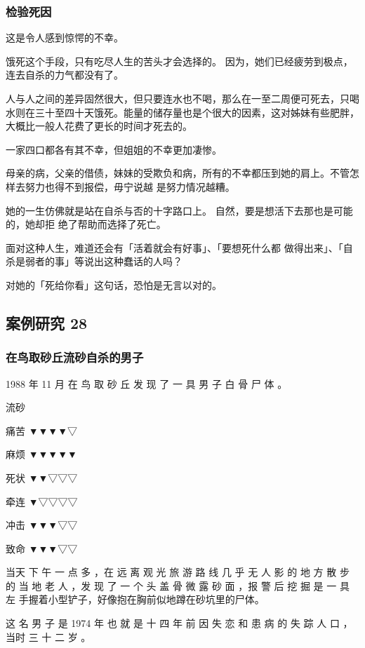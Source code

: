 \documentclass[UTF8]{ctexart}
\begin{document}
\subsubsection*{检验死因}

这是令人感到惊愕的不幸。

饿死这个手段，只有吃尽人生的苦头才会选择的。
因为，她们已经疲劳到极点，连去自杀的力气都没有了。

人与人之间的差异固然很大，但只要连水也不喝，那么在一至二周便可死去，只喝水则在三十至四十天饿死。能量的储存量也是个很大的因素，这对姊妹有些肥胖，大概比一般人花费了更长的时间才死去的。

一家四口都各有其不幸，但姐姐的不幸更加凄惨。

母亲的病，父亲的借债，妹妹的受欺负和病，所有的不幸都压到她的肩上。不管怎样去努力也得不到报偿，毋宁说越 是努力情况越糟。

她的一生仿佛就是站在自杀与否的十字路口上。
自然，要是想活下去那也是可能的，她却拒 绝了帮助而选择了死亡。

面对这种人生，难道还会有「活着就会有好事」、「要想死什么都 做得出来」、「自杀是弱者的事」等说出这种蠢话的人吗？

对她的「死给你看」这句话，恐怕是无言以对的。



\subsection{案例研究 28}

\subsubsection*{在鸟取砂丘流砂自杀的男子}

1988 年 11 月 在 鸟 取 砂 丘 发 现 了 一 具 男 子 白 骨 尸 体 。

流砂

痛苦 ▼▼▼▼▽

麻烦 ▼▼▼▼▼

死状 ▼▼▽▽▽

牵连 ▼▽▽▽▽

冲击 ▼▼▼▽▽

致命 ▼▼▼▽▽

当天 下 午 一 点 多 ，在 远 离 观 光 旅 游 路 线 几 乎 无 人 影 的 地 方 散 步 的 当 地 老 人 ，发 现 了 一 个 头 盖 骨 微 露 砂 面 ，报 警 后 挖 掘 是 一 具 左 手握着小型铲子，好像抱在胸前似地蹲在砂坑里的尸体。

这 名 男 子 是 1974 年 也 就 是 十 四 年 前 因 失 恋 和 患 病 的 失 踪 人 口 ，当时 三 十 二 岁 。
\end{document}
